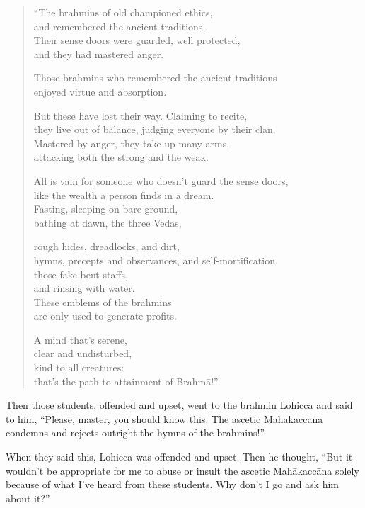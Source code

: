 \documentclass[12pt,openany]{book}%
\begin{document}
\begin{verse}%
“The brahmins of old championed ethics, \\
and remembered the ancient traditions. \\
Their sense doors were guarded, well protected, \\
and they had mastered anger. 

Those brahmins who remembered the ancient traditions \\
enjoyed virtue and absorption. 

But these have lost their way. Claiming to recite, \\
they live out of balance, judging everyone by their clan. \\
Mastered by anger, they take up many arms, \\
attacking both the strong and the weak. 

All is vain for someone who doesn’t guard the sense doors, \\
like the wealth a person finds in a dream. \\
Fasting, sleeping on bare ground, \\
bathing at dawn, the three Vedas, 

rough hides, dreadlocks, and dirt, \\
hymns, precepts and observances, and self-mortification, \\
those fake bent staffs, \\
and rinsing with water. \\
These emblems of the brahmins \\
are only used to generate profits. 

A mind that’s serene, \\
clear and undisturbed, \\
kind to all creatures: \\
that’s the path to attainment of \textsanskrit{Brahmā}!” 

%
\end{verse}

Then those students, offended and upset, went to the brahmin Lohicca and said to him, “Please, master, you should know this. The ascetic \textsanskrit{Mahākaccāna} condemns and rejects outright the hymns of the brahmins!” 

When they said this, Lohicca was offended and upset. Then he thought, “But it wouldn’t be appropriate for me to abuse or insult the ascetic \textsanskrit{Mahākaccāna} solely because of what I’ve heard from these students. Why don’t I go and ask him about it?” 
\end{document}
